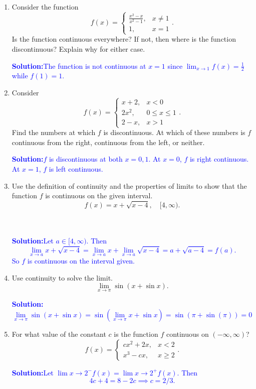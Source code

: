 \documentclass[letterpaper,11pt]{article}
\newcommand{\sol}[2]{\begin{minipage}[c][#1]{\linewidth}{\textcolor{blue}{\textbf{Solution:}}\quad \textcolor{blue}{#2}}\end{minipage}}
\newcommand{\sol}[2]{\begin{minipage}[c][#1]{\linewidth}{\vfill}\end{minipage}}
\begin{document}
\begin{enumerate}
\begin{enumerate}[label = \alph*.]
        \sol{0in}{$x=-4$, neither. $x=-2$, left. $x=2$, right. $x=4$, right.}
        \vfill
    \end{enumerate}
    \item Consider the function
    \[f(x) = \begin{cases}
        \frac{x^2-x}{x^2-1}, & x \neq 1 \\
        1, & x=1
    \end{cases}.\]
    Is the function continuous everywhere? If not, then where is the function discontinuous? Explain why for either case.
    
    \sol{0in}{The function is not continuous at $x=1$ since $\lim_{x\to 1} f(x) = \frac{1}{2}$ while $f(1) = 1$.}
    \vfill

    \newpage
    \item Consider
    \[f(x) = \begin{cases}
        x+2, & x < 0 \\
        2x^2, & 0 \leq x \leq 1 \\
        2 - x, & x > 1
    \end{cases}.\]
    Find the numbers at which $f$ is discontinuous. At which of these numbers is $f$ continuous from the right, continuous from the left, or neither.

    \sol{0in}{$f$ is discontinuous at both $x=0,1$. At $x=0$, $f$ is right continuous. At $x=1$, $f$ is left continuous.}
    \vfill

    \item Use the definition of continuity and the properties of limits to show that the function $f$ is continuous on the given interval.
    \[f(x) = x+\sqrt{x-4}, \quad [4,\infty).\]
    \\\\
    \sol{0in}{Let $a \in [4,\infty)$. Then
    \[\lim_{x\to a} x + \sqrt{x-4} = \lim_{x\to a} x + \lim_{x\to a} \sqrt{x-4} = a + \sqrt{a-4} = f(a).\]
    So $f$ is continuous on the interval given.}
    \vfill
    
    \item Use continuity to solve the limit.
    \[\lim_{x\to\pi} \sin(x+\sin{x}).\]

    \sol{0in}{
    \[\lim_{x\to \pi} \sin(x+\sin{x}) = \sin(\lim_{x\to \pi} x + \sin{x}) = \sin(\pi + \sin(\pi)) = 0\]}
    \vfill
    
    \newpage
    
    \item For what value of the constant $c$ is the function $f$ continuous on $(-\infty, \infty)$?
    \[f(x) = \begin{cases}
        cx^2 + 2x, & x < 2\\
        x^3 - cx, & x \geq 2
    \end{cases}.\]
    \sol{1in}{Let $\lim{x\to 2^-} f(x) = \lim{x\to 2^+} f(x)$. Then
    \[4c + 4 = 8 - 2c \implies c = 2/3.\]}
    \vfill


\end{enumerate}
\end{document}
